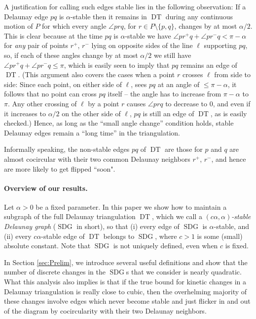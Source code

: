 \documentclass[letter,11pt]{article}
\def\SDG{\mathop{\mathrm{SDG}}}
\def\DT{\mathop{\mathrm{DT}}}
\begin{document}
A justification for calling such edges stable lies in the following
observation: If a Delaunay edge $pq$ is $\alpha$-stable then it 
remains in $\DT$ during any continuous motion of $P$ for which
every angle $\angle prq$, for $r\in P\setminus\{p,q\}$, changes
by at most $\alpha/2$. This is clear because at the time $pq$ is
$\alpha$-stable we have
$\angle pr^+q + \angle pr^-q < \pi-\alpha$ for \textit{any} pair of points
$r^+$, $r^-$ lying on opposite sides of the line $\ell$ supporting $pq$, so,
if each of these angles change by at most $\alpha/2$ we still have
$\angle pr^+q + \angle pr^-q \le \pi$, which is easily seen to imply
that $pq$ remains an edge of $\DT$. (This argument also covers the cases when a point $r$ crosses $\ell$ from side to side: Since
each point, on either side of $\ell$, sees $pq$ at an angle of $\leq \pi-\alpha$, it follows that no point can cross
$pq$ itself -- the angle has to increase from $\pi-\alpha$ to $\pi$. Any other crossing of $\ell$ by a point $r$ causes $\angle prq$ to
decrease to $0$, and even if it increases to $\alpha/2$ on the other side of $\ell$, $pq$ is still an edge of $\DT$, as is easily checked.)
Hence, as long as the ``small angle change'' condition 
holds, stable Delaunay edges remain a ``long time'' in the
triangulation.

Informally speaking, the non-stable edges $pq$ of $\DT$ are those for $p$ and $q$
are almost cocircular with their two common Delaunay neighbors
$r^+$, $r^-$, and hence are more likely to get flipped ``soon". 

\paragraph{Overview of our results.}
Let $\alpha>0$ be a fixed parameter.
In this paper we show how to maintain a subgraph of the full Delaunay 
triangulation $\DT$, which we call a {\em $(c\alpha,\alpha)$-stable Delaunay graph} ($\SDG$ in short), so that (i) every edge of $\SDG$ is $\alpha$-stable, 
and (ii) every $c\alpha$-stable edge of $\DT$ belongs to $\SDG$, where $c>1$ is some (small) absolute constant.
Note that $\SDG$ is not uniquely defined, even when $c$ is fixed.

In Section \ref{sec:Prelim}, we introduce several useful definitions and show that the number of discrete changes in the $\SDG$s
that we consider
is nearly quadratic. 
What this analysis also implies is that if the true bound for
kinetic changes in a Delaunay triangulation is really close to cubic, then
the overhelming majority of these changes involve edges which never become stable and just flicker in and out of the diagram by cocircularity with their two Delaunay neighbors.
\end{document}
